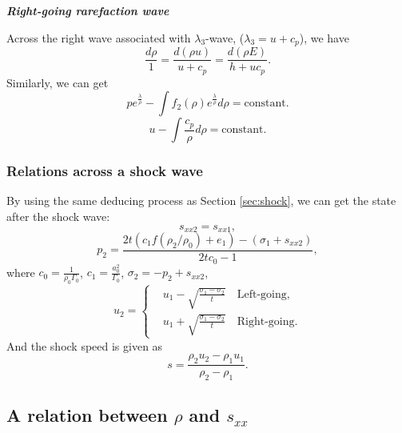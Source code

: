 \documentclass{article}
\numberwithin{equation}{section}
\numberwithin{table}{section}
\begin{document}
\emph{\textbf{Right-going rarefaction wave} }

Across the right wave associated with $\lambda_3$-wave, ($\lambda_3=u+c_p$), we have
\begin{equation}
  \frac{d\rho}{1} = \frac{d(\rho u)}{u+c_p} = \frac{d(\rho E)}{h+uc_p}.
\end{equation}
Similarly, we can get %
\begin{equation}\label{eq:p_rhopR}
  p e^{\frac{\lambda}{\rho}} - \int f_2(\rho) e^{\frac{\lambda}{\rho}}d\rho = \text{constant}.
\end{equation}
\begin{equation}\label{eq:u_rhopR}
  u-\int\frac{c_p}{\rho} d\rho = \text{constant}.
\end{equation}

\subsubsection{Relations across  a shock wave}\label{sec:shockp}
By using the same deducing process as Section \ref{sec:shock}, we can get the state after the shock wave:
\begin{equation}
  s_{xx2} = s_{xx1},
\end{equation}
\begin{equation}\label{eq:shockp}
  p_2= \frac{2t(c_1f(\rho_2/\rho_0)+e_1)-(\sigma_1+s_{xx2})}{2tc_0-1},
\end{equation}
where $c_0 = \frac{1}{\rho_0\Gamma_0}$, $c_1 = \frac{a_0^2}{\Gamma_0}$, $\sigma_2 = -p_2 +s_{xx2}$,
\begin{equation}\label{eq:shockup}
  u_2 = \left\{ \begin{aligned}
	 & u_1 - \sqrt{\frac{\sigma_1- \sigma_2}{t}} \quad \text{Left-going}, \\
	 & u_1 + \sqrt{\frac{\sigma_1- \sigma_2}{t}} \quad \text{Right-going}.
	\end{aligned}
	\right.
  \end{equation}
And the shock speed is given as
\begin{equation}
  s = \frac{\rho_2u_2-\rho_1u_1}{\rho_2-\rho_1}.
\end{equation}



\subsection{A relation between $\rho$ and $s_{xx}$ }\label{sec:relation}
\end{document}
